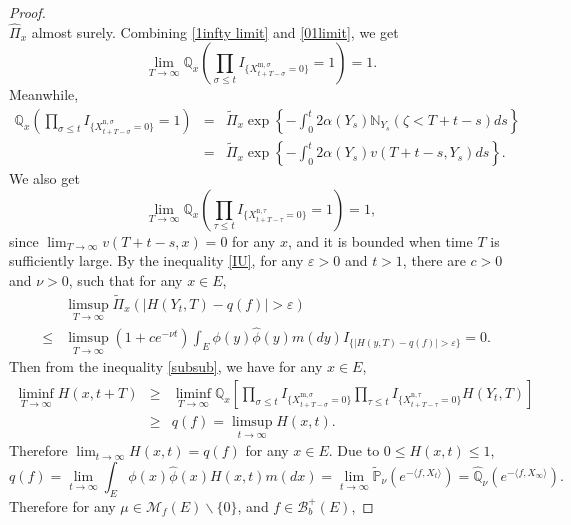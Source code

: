 \documentclass[12pt,a4paper]{amsart}
\numberwithin{equation}{section}
\theoremstyle{plain}
\theoremstyle{definition}
\theoremstyle{remark}
\begin{document}
\begin{proof}
\begin{equation}
\end{equation}
$\widehat\Pi_x$ almost surely.  Combining \eqref{1infty limit} and \eqref{01limit}, we get
\[
\lim_{T\rightarrow\infty}\mathbb Q_{x}\left(\prod_{\sigma\leq t}I_{\{ X_{t+T-\sigma}^{{\mathrm m},\sigma}=0\}}=1\right)=1.
\]
Meanwhile,
\begin{eqnarray*}
\mathbb Q_x\left(\prod_{\sigma\leq t}I_{\{ X_{t+T-\sigma}^{{\mathrm n},\sigma}=0\}}=1\right)
&=&\widetilde\Pi_x\exp\left\{-\int_0^t2\alpha(Y_s)\mathbb N_{Y_s}(\zeta<T+t-s)ds\right\}\\
&=&\widetilde\Pi_x\exp\left\{-\int_0^t2\alpha(Y_s)v(T+t-s,Y_s)ds\right\}.
\end{eqnarray*}
We also get
\[
\lim_{T\rightarrow\infty}\mathbb Q_x\left(\prod_{\tau\leq t}I_{\{ X_{t+T-\tau}^{{\mathrm n},\tau}=0\}}=1\right)=1,
\]
since $\lim_{T\rightarrow\infty} v(T+t-s,x)=0$ for any $x$, and it is bounded when time $T$ is sufficiently large.  By the inequality \eqref{IU}, for any $\varepsilon>0$ and $t>1$, there are $c>0$ and $\nu>0$, such that for any $x\in E$,
\begin{eqnarray*}
&&\limsup_{T\rightarrow\infty}\widetilde\Pi_x\left(|H(Y_t, T)-q(f)|>\varepsilon\right)\\
&\leq& \limsup_{T\rightarrow\infty}(1+ce^{-\nu t})\int_E\phi(y)\hat\phi(y)m(dy)I_{\{|H(y, T)-q(f)|>\varepsilon\}}=0.
\end{eqnarray*}
Then from the inequality \eqref{subsub}, we have for any $x\in E$,
\begin{eqnarray*}
\liminf_{T\rightarrow\infty}H(x, t+T)&\geq&  \liminf_{T\rightarrow\infty} \mathbb Q_x\left[\prod_{\sigma\leq t}I_{\{ X_{t+T-\sigma}^{{\mathrm m},\sigma}=0\}}\prod_{\tau\leq t}I_{\{ X_{t+T-\tau}^{{\mathrm n},\tau}=0\}}H(Y_t, T)\right]\\
&\geq& q(f)=\limsup_{t\rightarrow\infty}H(x, t).
\end{eqnarray*}
 Therefore  $\lim_{t\rightarrow\infty}H(x, t)=q(f)$ for any $x\in E$.
Due to $0\leq H(x,t)\leq 1$,
\begin{equation*}
q(f)=\lim_{t\rightarrow\infty}\int_E\phi(x)\hat\phi(x)H(x,t)m(dx)
=\lim_{t\rightarrow\infty}\widetilde{\mathbb P}_{\nu}\left(e^{-\langle f, X_t\rangle }\right)
=\widehat{\mathbb Q}_{\nu}\left(e^{-\langle f, X_{\infty}\rangle }\right).
\end{equation*}
Therefore for any $\mu\in\mathcal M_f(E)\backslash\{0\}$, and $f\in\mathcal B_b^+(E)$,

\end{proof}
\end{document}
